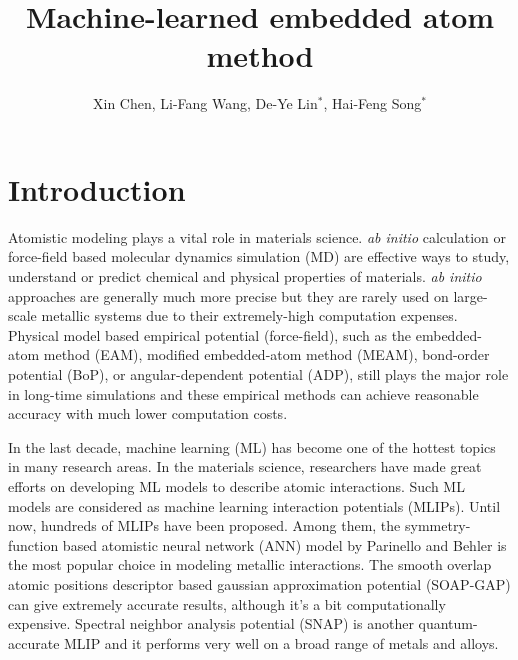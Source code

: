 \documentclass[prb,reprint]{revtex4-2}
\begin{document}
\title{
    Machine-learned embedded atom method
}

\author{Xin Chen, 
        Li-Fang Wang, 
        De-Ye Lin$^\mathrm{*}$, 
        Hai-Feng Song$^\mathrm{*}$}



% 
%
\begin{abstract}
\end{abstract}

\maketitle

% 
%
\section{Introduction}
\label{sec:introduction}

Atomistic modeling plays a vital role in materials science. \textit{ab initio} 
calculation or force-field based molecular dynamics simulation (MD) are 
effective ways to study, understand or predict chemical and physical properties 
of materials. \textit{ab initio} approaches are generally much more precise but 
they are rarely used on large-scale metallic systems due to their extremely-high 
computation expenses. Physical model based empirical potential (force-field), 
such as the embedded-atom method (EAM), modified embedded-atom method (MEAM), 
bond-order potential (BoP), or angular-dependent potential (ADP), still plays 
the major role in long-time simulations and these empirical methods can achieve 
reasonable accuracy with much lower computation costs. 

In the last decade, machine learning (ML) has become one of the hottest 
topics in many research areas. In the materials science, researchers have made 
great efforts on developing ML models to describe atomic interactions. Such ML 
models are considered as machine learning interaction potentials (MLIPs). Until 
now, hundreds of MLIPs have been proposed. Among them, the symmetry-function 
based atomistic neural network (ANN) model by Parinello and Behler is the most 
popular choice in modeling metallic interactions. The smooth overlap atomic 
positions descriptor based gaussian approximation potential (SOAP-GAP) can give
extremely accurate results, although it's a bit computationally expensive. 
Spectral neighbor analysis potential (SNAP) is another quantum-accurate MLIP and
it performs very well on a broad range of metals and alloys. 
\end{document}
